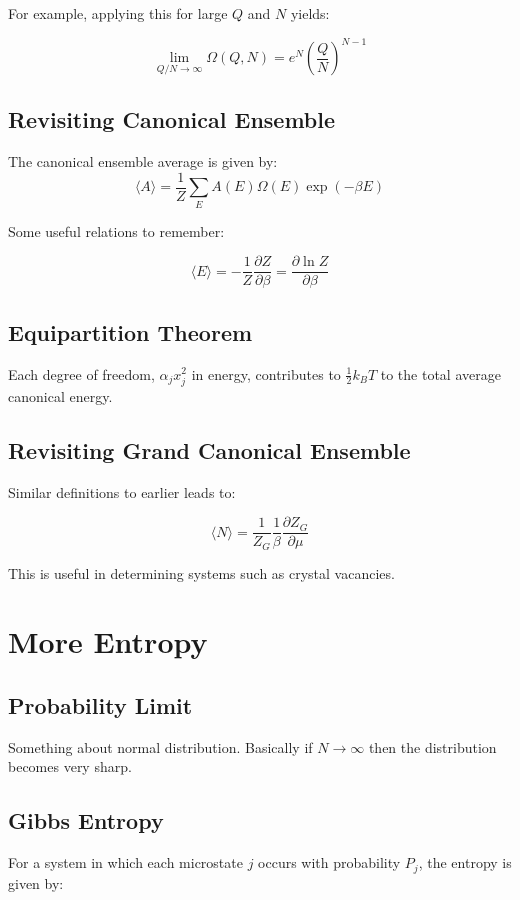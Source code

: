\documentclass[12pt]{article}
\begin{document}
For example, applying this for large $Q$ and $N$ yields:

\[\lim_{Q/N\to\infty}\Omega(Q,N) = e^N \left(\frac{Q}{N}\right)^{N-1}\]

\subsection{Revisiting Canonical Ensemble}

The canonical ensemble average is given by:
\[\langle A \rangle = \frac{1}{Z}\sum_E A(E)\Omega(E)\exp{(-\beta E)}\]

Some useful relations to remember:

\[\langle E \rangle = -\frac{1}{Z}\frac{\partial Z}{\partial \beta} = \frac{\partial \ln Z}{\partial \beta}\]

\subsection{Equipartition Theorem}

Each degree of freedom, $\alpha_j x_j^2$ in energy, contributes to $\frac12 k_B T$ to the total average canonical energy.


\subsection{Revisiting Grand Canonical Ensemble}

Similar definitions to earlier leads to:

\[\langle N \rangle = \frac{1}{Z_G}\frac{1}{\beta}\frac{\partial Z_G}{\partial \mu}\]

This is useful in determining systems such as crystal vacancies.

\section{More Entropy}

\subsection{Probability Limit}
Something about normal distribution. Basically if $N\to \infty$ then the distribution becomes very sharp.

\subsection{Gibbs Entropy}

For a system in which each microstate $j$ occurs with probability $P_j$, the entropy is given by:
\end{document}
